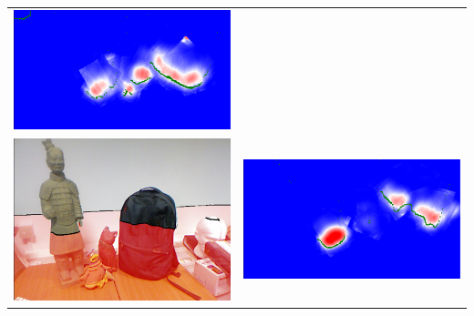 \documentclass[10pt,onecolumn,letterpaper]{article}
\begin{document}
\begin{tabular}{cc}
\includegraphics[height=\imheight]{real/statue/slice_00080.png} \\
\includegraphics[height=\imheight]{real/statue/rgb_00110.png} &
\includegraphics[height=\imheight]{real/statue/slice_00110.png} \\

\end{tabular}
\end{document}
